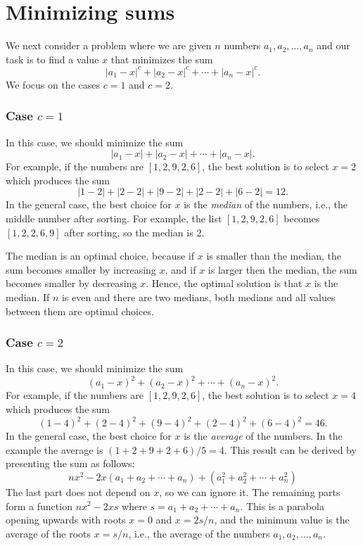 \section{Minimizing sums}

We next consider a problem where
we are given $n$ numbers $a_1,a_2,\ldots,a_n$
and our task is to find a value $x$
that minimizes the sum
\[|a_1-x|^c+|a_2-x|^c+\cdots+|a_n-x|^c.\]
We focus on the cases $c=1$ and $c=2$.

\subsubsection{Case $c=1$}

In this case, we should minimize the sum
\[|a_1-x|+|a_2-x|+\cdots+|a_n-x|.\]
For example, if the numbers are $[1,2,9,2,6]$,
the best solution is to select $x=2$
which produces the sum
\[
|1-2|+|2-2|+|9-2|+|2-2|+|6-2|=12.
\]
In the general case, the best choice for $x$
is the \textit{median} of the numbers,
i.e., the middle number after sorting.
For example, the list $[1,2,9,2,6]$
becomes $[1,2,2,6,9]$ after sorting,
so the median is 2.

The median is an optimal choice,
because if $x$ is smaller than the median,
the sum becomes smaller by increasing $x$,
and if $x$ is larger then the median,
the sum becomes smaller by decreasing $x$.
Hence, the optimal solution is that $x$
is the median.
If $n$ is even and there are two medians,
both medians and all values between them
are optimal choices.

\subsubsection{Case $c=2$}

In this case, we should minimize the sum
\[(a_1-x)^2+(a_2-x)^2+\cdots+(a_n-x)^2.\]
For example, if the numbers are $[1,2,9,2,6]$,
the best solution is to select $x=4$
which produces the sum
\[
(1-4)^2+(2-4)^2+(9-4)^2+(2-4)^2+(6-4)^2=46.
\]
In the general case, the best choice for $x$
is the \emph{average} of the numbers.
In the example the average is $(1+2+9+2+6)/5=4$.
This result can be derived by presenting
the sum as follows:
\[
nx^2 - 2x(a_1+a_2+\cdots+a_n) + (a_1^2+a_2^2+\cdots+a_n^2)
\]
The last part does not depend on $x$,
so we can ignore it.
The remaining parts form a function
$nx^2-2xs$ where $s=a_1+a_2+\cdots+a_n$.
This is a parabola opening upwards
with roots $x=0$ and $x=2s/n$,
and the minimum value is the average
of the roots $x=s/n$, i.e.,
the average of the numbers $a_1,a_2,\ldots,a_n$.

